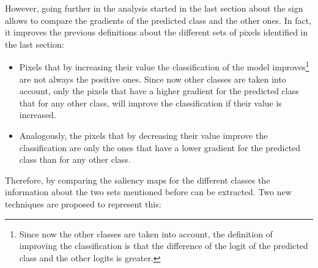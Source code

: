 \documentclass[preprint,12pt]{elsarticle}
\begin{document}
However, going further in the analysis started in the last section about the sign allows to compare the gradients of the predicted class and the other ones. In fact, it improves the previous definitions about the different sets of pixels identified in the last section:

\begin{itemize}
    \item Pixels that by increasing their value the classification of the model improves\footnote{Since now the other classes are taken into account, the definition of improving the classification is that the difference of the logit of the predicted class and the other logits is greater.} are not always the positive ones. Since now other classes are taken into account, only the pixels that have a higher gradient for the predicted class that for any other class, will improve the classification if their value is increased.
    \item Analogously, the pixels that by decreasing their value improve the classification are only the ones that have a lower gradient for the predicted class than for any other class.
\end{itemize}

Therefore, by comparing the saliency maps for the different classes the information about the two sets mentioned before can be extracted. Two new techniques are proposed to represent this:
\end{document}
